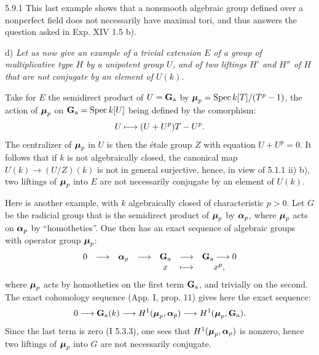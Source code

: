 \begin{remark}{5.9.1}\label{XVII.5.9.1}
This last example shows that a nonsmooth algebraic group defined over a nonperfect field does not necessarily have maximal tori, and thus answers the question asked in Exp. XIV 1.5 b).
\end{remark}
\noindent d) \emph{Let us now give an example of a trivial extension $E$ of a group of multiplicative type $H$ by a unipotent group $U$, and of two liftings $H'$ and $H''$ of $H$ that are not conjugate by an element of $U(k)$.}

Take for $E$ the semidirect product of $U=\mathbf{G}_{\mathrm{a}}$ by $\boldsymbol{\mu}_p=\operatorname{Spec} k[T]/(T^p-1)$, the action of $\boldsymbol{\mu}_p$ on $\mathbf{G}_{\mathrm{a}}=\operatorname{Spec} k[U]$ being defined by the comorphism:
\[
 U\longmapsto(U+U^p)T-U^p.
\]
The centralizer of $\boldsymbol{\mu}_p$ in $U$ is then the étale group $Z$ with equation $U+U^p=0$. It follows that if $k$ is not algebraically closed, the canonical map $U(k)\to(U/Z)(k)$ is not in general surjective, hence, in view of 5.1.1 ii) b), two liftings of $\boldsymbol{\mu}_p$ into $E$ are not necessarily conjugate by an element of $U(k)$.

Here is another example, with $k$ algebraically closed of characteristic $p>0$. Let $G$ be the radicial group that is the semidirect product of $\boldsymbol{\mu}_p$ by $\boldsymbol{\alpha}_p$, where $\boldsymbol{\mu}_p$ acts on $\boldsymbol{\alpha}_p$ by ``homotheties''. One then has an exact sequence of algebraic groups with operator group $\boldsymbol{\mu}_p$:
\[
 \begin{array}{ccccccc}
 0&\longrightarrow&\boldsymbol{\alpha}_p&\longrightarrow&\mathbf{G}_{\mathrm{a}}&\longrightarrow&\mathbf{G}_{\mathrm{a}}\longrightarrow0\\
 &&&&x&\longmapsto&x^p,
 \end{array}
\]
where $\boldsymbol{\mu}_p$ acts by homotheties on the first term $\mathbf{G}_{\mathrm{a}}$, and trivially on the second. The exact cohomology sequence (App. I, prop. 11) gives here the exact sequence:
\[
 0\longrightarrow\mathbf{G}_{\mathrm{a}}(k)\longrightarrow H^1(\boldsymbol{\mu}_p,\boldsymbol{\alpha}_p)\longrightarrow H^1(\boldsymbol{\mu}_p,\mathbf{G}_{\mathrm{a}}).
\]
Since the last term is zero (I 5.3.3), one sees that $H^1(\boldsymbol{\mu}_p,\boldsymbol{\alpha}_p)$ is nonzero, hence two liftings of $\boldsymbol{\mu}_p$ into $G$ are not necessarily conjugate.

